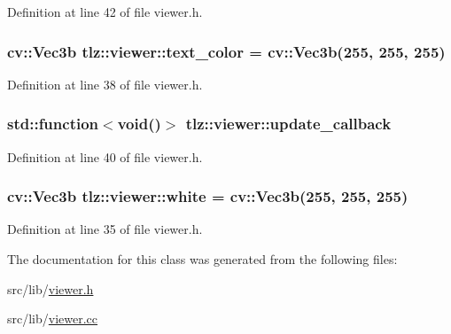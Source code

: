 Definition at line 42 of file viewer.\+h.

\subsubsection[{\texorpdfstring{text\+\_\+color}{text_color}}]{\setlength{\rightskip}{0pt plus 5cm}cv\+::\+Vec3b tlz\+::viewer\+::text\+\_\+color = cv\+::\+Vec3b(255, 255, 255)}\hypertarget{classtlz_1_1viewer_a483a152f05561ae8f33fafae05a08b5f}{}\label{classtlz_1_1viewer_a483a152f05561ae8f33fafae05a08b5f}


Definition at line 38 of file viewer.\+h.

\subsubsection[{\texorpdfstring{update\+\_\+callback}{update_callback}}]{\setlength{\rightskip}{0pt plus 5cm}std\+::function$<$void()$>$ tlz\+::viewer\+::update\+\_\+callback}\hypertarget{classtlz_1_1viewer_a7142596a0bf1aac7b0358759651639b4}{}\label{classtlz_1_1viewer_a7142596a0bf1aac7b0358759651639b4}


Definition at line 40 of file viewer.\+h.

\subsubsection[{\texorpdfstring{white}{white}}]{\setlength{\rightskip}{0pt plus 5cm}cv\+::\+Vec3b tlz\+::viewer\+::white = cv\+::\+Vec3b(255, 255, 255)}\hypertarget{classtlz_1_1viewer_a3dadda68d6b156de3fe6cc68ff9bc623}{}\label{classtlz_1_1viewer_a3dadda68d6b156de3fe6cc68ff9bc623}


Definition at line 35 of file viewer.\+h.



The documentation for this class was generated from the following files\+:\begin{DoxyCompactItemize}
\item 
src/lib/\hyperlink{viewer_8h}{viewer.\+h}\item 
src/lib/\hyperlink{lib_2viewer_8cc}{viewer.\+cc}\end{DoxyCompactItemize}
